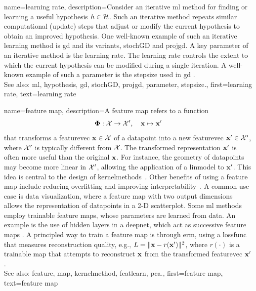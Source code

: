 {name={learning rate}, 
	description={Consider 
		an iterative \gls{ml} method for finding or learning a useful \gls{hypothesis} $h \in \mathcal{H}$. 
		Such an iterative method repeats similar computational (update) steps that adjust or 
		modify the current \gls{hypothesis} to obtain an improved \gls{hypothesis}. One 
		well-known example of such an iterative learning method is \gls{gd} and its variants, \gls{stochGD} and 
		\gls{projgd}. A key \gls{parameter} of an iterative method is the learning rate. 
		The learning rate controls the extent to which the current \gls{hypothesis} 
		can be modified during a single iteration. A well-known example of such a \gls{parameter} 
		is the \gls{stepsize} used in \gls{gd} \cite[Ch. 5]{MLBasics}.
				\\
		See also: \gls{ml}, \gls{hypothesis}, \gls{gd}, \gls{stochGD}, \gls{projgd}, \gls{parameter}, \gls{stepsize}.},
	first={learning rate},
	text={learning rate} 
}

{name={feature map}, 
	description={A \gls{feature} \gls{map} refers to a \gls{function} 
		$$
		{\bf \Phi}: \mathcal{X} \rightarrow \mathcal{X}', \quad {\bf x} \mapsto {\bf x}'
		$$
		that transforms a \gls{featurevec} ${\bf x} \in \mathcal{X}$ of 
 		a \gls{datapoint} into a new \gls{featurevec} ${\bf x}' \in \mathcal{X}'$, 
 		where $\mathcal{X}'$ is typically different from $\mathcal{X}$.
 		The transformed representation ${\bf x}'$ is often more useful than the original 
 		${\bf x}$. For instance, the geometry of \glspl{datapoint} may become more linear 
 		in $\mathcal{X}'$, allowing the application of a \gls{linmodel} to ${\bf x}'$. 
 		This idea is central to the design of \glspl{kernelmethod}~\cite{LearningKernelsBook}.
 		Other benefits of using a \gls{feature} \gls{map} include reducing \gls{overfitting} and 
 		improving \gls{interpretability}~\cite{Ribeiro2016}. A common use case is \gls{data} 
 		visualization, where a \gls{feature} \gls{map} with two output dimensions allows the representation 
 		of \glspl{datapoint} in a 2-D \gls{scatterplot}. Some \gls{ml} methods employ trainable 
 		\gls{feature} \glspl{map}, whose \glspl{parameter} are learned from \gls{data}. An example is 
 		the use of hidden layers in a \gls{deepnet}, which act as successive \gls{feature} \glspl{map} 
 		\cite{MallatUnderstandingDeepLearning}. A principled way to train a \gls{feature} \gls{map} 
 		is through \gls{erm}, using a \gls{lossfunc} that measures reconstruction quality, 
 		e.g., $L = \|{\bf x} - r({\bf x}')\|^2$, where $r(\cdot)$ is a trainable
 		\gls{map} that attempts to reconstruct ${\bf x}$ from the transformed \gls{featurevec} ${\bf x}'$.
				\\
		See also: \gls{feature}, \gls{map}, \gls{kernelmethod}, \gls{featlearn}, \gls{pca}.},
	first={feature map},
	text={feature map} 
}
	
